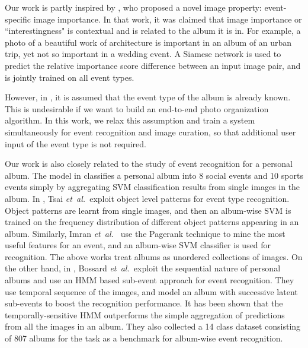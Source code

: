 \documentclass[runningheads]{llncs}
\newcommand{\etal}{\mbox{\emph{et al.\ }}}
\begin{document}
Our work is partly inspired by \cite{CVPR}, who proposed a novel image property: event-specific image importance. In that work, it was claimed that image importance or ``interestingness" is contextual and is related to the album it is in. For example, a photo of a beautiful work of architecture is important in an album of an urban trip, yet not so important in a wedding event.  A Siamese network is used to predict the relative importance score difference between an input image pair, and is jointly trained on all event types.

However, in \cite{CVPR}, it is assumed that the event type of the album is already known. This is undesirable if we want to build an end-to-end photo organization algorithm. In this work, we relax this assumption and train a system simultaneously for event recognition and image curation, so that additional user input of the event type is not required.


Our work is also closely related to the study of event recognition for a personal album. The model in \cite{Mattivi11} classifies a personal album into 8 social events and 10 sports events simply by aggregating SVM classification results from single images in the album. In \cite{pattern}, Tsai \etal exploit object level patterns for event type recognition. Object patterns are learnt from single images,  and then an album-wise SVM is trained on the frequency distribution of different object patterns appearing in an album. Similarly, Imran \etal \cite{Imran09} use the Pagerank technique to mine the most useful features for an event, and an album-wise SVM classifier is used for recognition.
%
%
%
%
%
%
The above works treat albums as unordered collections of images. On the other hand, in \cite{HMM}, Bossard \etal exploit the sequential nature of personal albums and use an HMM based sub-event approach for event recognition. They use temporal sequence of the images, and model an album with successive latent sub-events to boost the recognition performance. It has been shown that the temporally-sensitive HMM outperforms the simple aggregation of predictions from all the images in an album.  They also collected a 14 class dataset consisting of 807 albums for the task as a benchmark for album-wise event recognition. 
%
%
%
\end{document}
